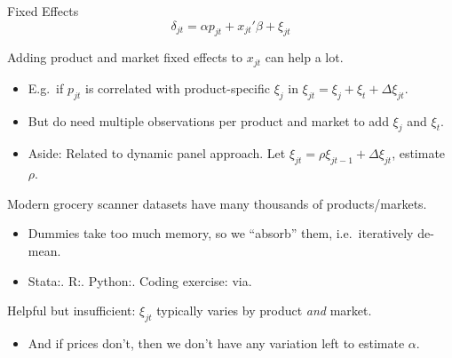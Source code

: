 \documentclass[aspectratio=169,t,11pt,table]{beamer}
\begin{document}
\begin{frame}{Fixed Effects}
    \vspace{-\baselineskip}
    \begin{equation*}
        \delta_{jt} = \alpha p_{jt} + x_{jt}'\beta + \xi_{jt}
    \end{equation*}
    \vspace{-0.5\baselineskip}
    \begin{wideitemize}
        \item Adding product and market fixed effects to $x_{jt}$ can help a lot.
        \begin{itemize}
            \item E.g.\ if $p_{jt}$ is correlated with product-specific $\xi_j$ in $\xi_{jt} = \xi_j + \xi_t + \Delta\xi_{jt}$.
            \item But do need multiple observations per product and market to add $\xi_j$ and $\xi_t$.
            \pause
            \item Aside: Related to dynamic panel approach. Let $\xi_{jt} = \rho \xi_{jt-1} + \Delta\xi_{jt}$, estimate $\rho$.
        \end{itemize}
        \pause
        \item Modern grocery scanner datasets have many thousands of products/markets.
        \begin{itemize}
            \item Dummies take too much memory, so we ``absorb'' them, i.e.\ iteratively de-mean.
            \item Stata:. R:.  Python:. Coding exercise: via.
        \end{itemize}
        \pause
        \item Helpful but insufficient: $\xi_{jt}$ typically varies by product \textit{and} market.
        \begin{itemize}
            \item And if prices don't, then we don't have any variation left to estimate $\alpha$.
        \end{itemize}
    \end{wideitemize}
\end{frame}
\end{document}
